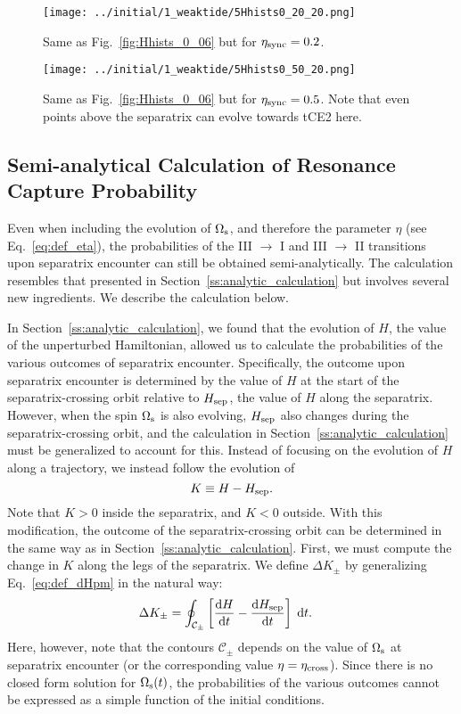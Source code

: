 \documentclass[
        fleqn,
        usenatbib,
        referee
    ]{mnras}
\newcommand*{\rd}[2]{\frac{\mathrm{d}#1}{\mathrm{d}#2}}
\newcommand*{\s}[1]{\left[#1\right]}
\newlength{\colummwidth}
\begin{document}
\begin{figure}
    \centering
    \texttt{[image: ../initial/1\_weaktide/5Hhists0\_20\_20.png]}
    \caption{Same as Fig.~\ref{fig:Hhists_0_06} but for $\eta_{\rm sync} =
    0.2$. }\label{fig:Hhists_0_20}
\end{figure}
\begin{figure}
    \centering
    \texttt{[image: ../initial/1\_weaktide/5Hhists0\_50\_20.png]}
    \caption{Same as Fig.~\ref{fig:Hhists_0_06} but for $\eta_{\rm sync} =
    0.5$. Note that even points above the separatrix can evolve towards tCE2
    here.}\label{fig:Hhists_0_50}
\end{figure}

\subsection{Semi-analytical Calculation of Resonance Capture Probability
}\label{ss:phop_weaktide}

Even when including the evolution of $\Omega_{\rm s}$, and therefore the
parameter $\eta$ (see Eq.~\ref{eq:def_eta}), the probabilities of the III $\to$ I
and III $\to$ II transitions upon separatrix encounter can still be obtained
semi-analytically. The calculation resembles that presented in
Section~\ref{ss:analytic_calculation} but involves several new ingredients. We
describe the calculation below.

In Section~\ref{ss:analytic_calculation}, we found that the evolution of $H$,
the value of the unperturbed Hamiltonian, allowed us to calculate the
probabilities of the various outcomes of separatrix encounter. Specifically, the
outcome upon separatrix encounter is determined by the value of $H$ at the start
of the separatrix-crossing orbit relative to $H_{\rm sep}$, the value of $H$
along the separatrix. However, when the spin $\Omega_{\rm s}$ is also evolving,
$H_{\rm sep}$ also changes during the separatrix-crossing orbit, and the
calculation in Section~\ref{ss:analytic_calculation} must be generalized to
account for this. Instead of focusing on the evolution of $H$ along a
trajectory, we instead follow the evolution of
\begin{equation}
    K \equiv H - H_{\rm sep}.
\end{equation}
Note that $K > 0$ inside the separatrix, and $K < 0$ outside. With this
modification, the outcome of the separatrix-crossing orbit can be determined in
the same way as in Section~\ref{ss:analytic_calculation}. First, we must compute
the change in $K$ along the legs of the separatrix. We define $\Delta K_{\pm}$
by generalizing Eq.~\eqref{eq:def_dHpm} in the natural way:
\begin{align}
    \Delta K_{\pm} &= \oint_{\mathcal{C}_{\pm}} \s{\rd{H}{t}
        - \rd{H_{\rm sep}}{t}}\;\mathrm{d}t.\label{eq:def_dK_weaktide}
\end{align}
Here, however, note that the contours $\mathcal{C}_{\pm}$ depends on the value
of $\Omega_{\rm s}$ at separatrix encounter (or the corresponding value $\eta =
\eta_{\rm cross}$). Since there is no closed form solution for $\Omega_{\rm
s}(t)$, the probabilities of the various outcomes cannot be expressed as a
simple function of the initial conditions.
\end{document}
